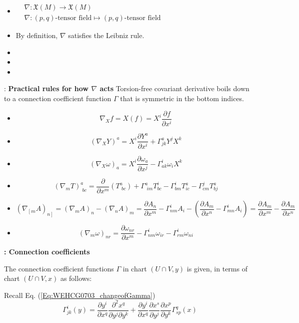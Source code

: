 \begin{enumerate}
\begin{itemize}
\item $\begin{aligned} & \quad \\ & \nabla: \mathfrak{X}(M) \to \mathfrak{X}(M) \\
  & \nabla : (p,q)\text{-tensor field} \mapsto (p,q)\text{-tensor field} \end{aligned}$
\item By definition, $\nabla$ satisfies the Leibniz rule. 
\item
\item
\item
\end{itemize}
\end{enumerate}

: \textbf{Practical rules for how $\nabla$ acts}
Torsion-free covariant derivative boils down to a connection coefficient function $\Gamma$ that is symmetric in the bottom indices.

\begin{itemize}
\item \[
\nabla_Xf = X(f) = X^i \frac{ \partial f}{ \partial x^i }
\]
\item \[
(\nabla_X Y)^a = X^i \frac{ \partial Y^a}{ \partial x^i} + \Gamma^a_{jk} Y^j X^k 
\]
\item \[
(\nabla_X \omega)_a = X^i \frac{ \partial \omega_a}{ \partial x^j}  - \Gamma^i_{ak} \omega_i X^k
\]
\item \[
(\nabla_m T)^a_{ \, \, bc} = \frac{ \partial }{ \partial x^m} (T^a_{ \, \, bc} ) + \Gamma^a_{ \, \, im} T^i_{bc} - \Gamma^i_{bm} T^a_{ic} - \Gamma^j_{cm} T^a_{bj}
\]
\item \[
(\nabla_{ \left[ m \right. } A)_{ \left. n \right] } = (\nabla_m A)_n - (\nabla_n A)_m = \frac{ \partial A_n}{ \partial x^m } - \Gamma^i_{ nm} A_i - \left( \frac{ \partial A_m}{ \partial x^n} - \Gamma^i_{mn} A_i \right) = \frac{ \partial A_m}{ \partial x^m} - \frac{ \partial A_m}{ \partial x^n }
\]
\item \[
(\nabla_m \omega)_{nr} = \frac{ \partial \omega_{nr}}{ \partial x^m} - \Gamma^i_{nm } \omega_{ir} - \Gamma^i_{rm} \omega_{ni}
\]
\end{itemize}


\textbf{: Connection coefficients}

\questionhead{}

The connection coefficient functions $\Gamma$ in chart $(U \cap V,y)$ is given, in terms of chart $(U\cap V,x)$ as follows:

Recall Eq. (\ref{Eq:WEHCG0703_changeofGamma})
\[
\Gamma^i_{jk}(y) = \frac{ \partial y^i}{ \partial x^q} \frac{ \partial^2 x^q}{ \partial y^j \partial y^k} + \frac{ \partial y^i}{ \partial x^q } \frac{ \partial x^s }{ \partial y^j} \frac{ \partial x^p }{ \partial y^k} \Gamma^q_{sp}(x)
\]
